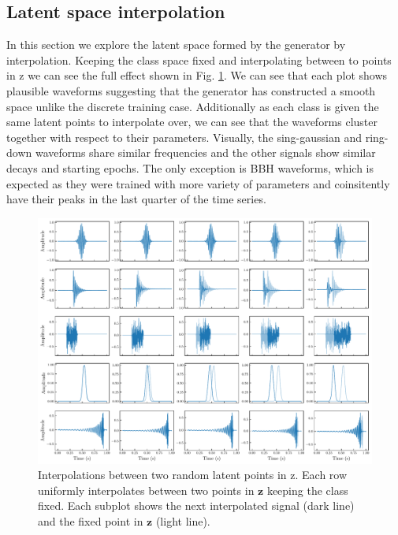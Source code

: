 \documentclass[12pt]{iopart}
\begin{document}
\subsection{Latent space interpolation}
In this section we explore the latent space formed by the generator by interpolation. Keeping the class space fixed and interpolating between to points in z we can see the full effect shown in Fig. \ref{fig:z_interp}. We can see that each plot shows plausible waveforms suggesting that the generator has constructed a smooth space unlike the discrete training case. Additionally as each class is given the same latent points to interpolate over, we can see that the waveforms cluster together with respect to their parameters. Visually, the sing-gaussian and ring-down waveforms share similar frequencies and the other signals show similar decays and starting epochs. The only exception is BBH waveforms, which is expected as they were trained with more variety of parameters and coinsitently have their peaks in the last quarter of the time series.
\begin{figure}[h]
    \centering
    \includegraphics[width=\textwidth]{figures/fix_c_interp_z.pdf}
    \caption{Interpolations between two random latent points in z. Each row uniformly interpolates between two points in $\mathbf{z}$ keeping the class fixed. Each subplot shows the next interpolated signal (dark line) and the fixed point in $\mathbf{z}$ (light line). }
    \label{fig:z_interp}
\end{figure}
\end{document}
